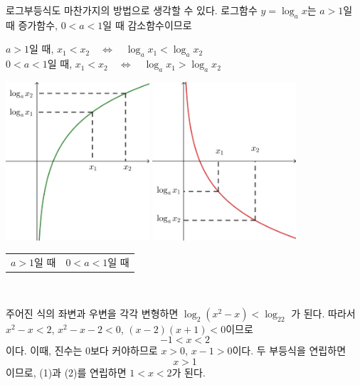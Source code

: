 \documentclass{oblivoir}
\begin{document}
\newpage
로그부등식도 마찬가지의 방법으로 생각할 수 있다.
로그함수 \(y=\log_ax\)는 \(a>1\)일 때 증가함수, \(0<a<1\)일 때 감소함수이므로
\begin{mdframed}[leftmargin=.1\textwidth,rightmargin=.1\textwidth]\centering
\(a>1\)일 때,		\quad \(x_1<x_2\quad\Longleftrightarrow\quad \log_a{x_1}<\log_a{x_2}\)\\
\(0<a<1\)일 때,	\quad \(x_1<x_2\quad\Longleftrightarrow\quad \log_a{x_1}>\log_a{x_2}\)
\end{mdframed}
\begin{center}
\includegraphics[width=0.4\textwidth]{inequality_3}
\qquad\quad
\includegraphics[width=0.4\textwidth]{inequality_4}
\begin{tabu}{X[c]X[c]}
\(a>1\)일 때
&
\(0<a<1\)일 때
\end{tabu}
\end{center}

%
\label{ineq3}
\\[-20pt]
\begin{mdframed}
주어진 식의 좌변과 우변을 각각 변형하면
\(\log_2(x^2-x)<\log_22\)
가 된다.
따라서 \(x^2-x<2\), \(x^2-x-2<0\), \((x-2)(x+1)<0\)이므로
\[-1<x<2\tag{1}\]
이다.
이때, 진수는 0보다 커야하므로 \(x>0\), \(x-1>0\)이다.
두 부등식을 연립하면
\[x>1\tag{2}\]
이므로, (1)과 (2)를 연립하면 \(1<x<2\)가 된다.
\end{mdframed}
\end{document}
